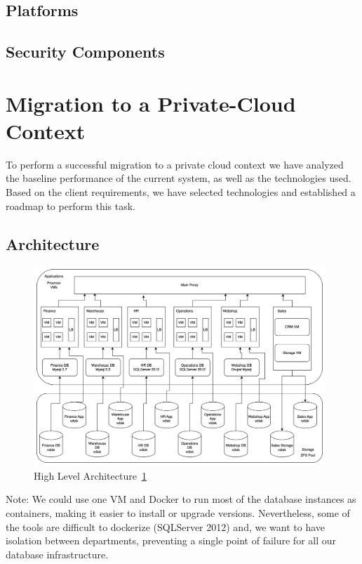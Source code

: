 \documentclass{llncs}
\begin{document}
\subsection{Platforms}

\subsection{Security Components}


\section{Migration to a Private-Cloud Context}

To perform a successful migration to a private cloud context we have analyzed the baseline performance of the current system, as well as the technologies used. Based on the client requirements, we have selected technologies and established a roadmap to perform this task.   

\subsection{Architecture}

\begin{figure}[htbp]
  \begin{center}
    \includegraphics[width=11cm]{diagrams/architecture.drawio.png}
    \caption{High Level Architecture~\ref{High_Level_Architecture}}
    \label{High_Level_Architecture} %
  \end{center}
\end{figure}

Note: We could use one VM and Docker to run most of the database instances as containers, making it easier to install or upgrade versions. Nevertheless, some of the tools are difficult to dockerize (SQLServer 2012) and, we want to have isolation between departments, preventing a single point of failure for all our database infrastructure.
\end{document}
